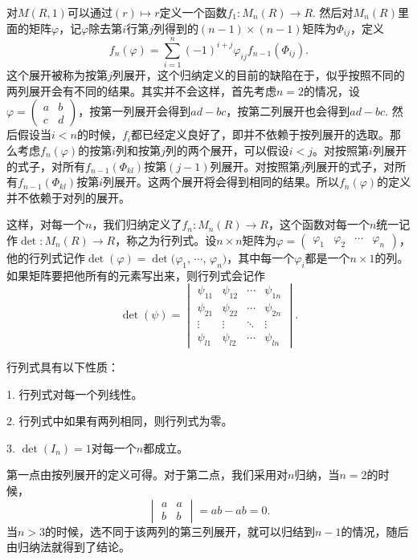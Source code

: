 对$M(R,1)$可以通过$(r)\mapsto r$定义一个函数$f_1:M_n(R)\to R$. 然后对$M_n(R)$里面的矩阵$\varphi$，记$\varphi$除去第$i$行第$j$列得到的$(n-1)\times (n-1)$矩阵为$\Phi_{ij}$，定义
\[
	f_n(\varphi)=\sum_{i=1}^n (-1)^{i+j}\varphi_{ij}f_{n-1}(\Phi_{ij}).
\]
这个展开被称为按第$j$列展开，这个归纳定义的目前的缺陷在于，似乎按照不同的两列展开会有不同的结果。其实并不会这样，首先考虑$n=2$的情况，设$\varphi=\begin{pmatrix}a&b\\c&d\end{pmatrix}$，按第一列展开会得到$ad-bc$，按第二列展开也会得到$ad-bc$. 然后假设当$i<n$的时候，$f_i$都已经定义良好了，即并不依赖于按列展开的选取。那么考虑$f_n(\varphi)$的按第$i$列和按第$j$列的两个展开，可以假设$i<j$。对按照第$i$列展开的式子，对所有$f_{n-1}(\Phi_{kl})$按第$(j-1)$列展开。对按照第$j$列展开的式子，对所有$f_{n-1}(\Phi_{kl})$按第$i$列展开。这两个展开将会得到相同的结果。所以$f_n(\varphi)$的定义并不依赖于对列的展开。

这样，对每一个$n$，我们归纳定义了$f_n:M_n(R)\to R$，这个函数对每一个$n$统一记作$\det:M_n(R)\to R$，称之为行列式。设$n\times n$矩阵为$\varphi=\begin{pmatrix}\varphi_{1} & \varphi_{2} & \cdots & \varphi_{n}\end{pmatrix}$，他的行列式记作$\det(\varphi)=\det(\varphi_1$, $\cdots$, $\varphi_n)$，其中每一个$\varphi_i$都是一个$n\times 1$的列。如果矩阵要把他所有的元素写出来，则行列式会记作
\[
\det(\psi)=\begin{vmatrix}
	\psi_{11} & \psi_{12} & \cdots & \psi_{1n}\\
	\psi_{21} & \psi_{22} & \cdots & \psi_{2n}\\
	\vdots & \vdots & \ddots & \vdots \\
	\psi_{l1} & \psi_{l2} & \cdots & \psi_{ln}
\end{vmatrix}.
\]

\pro 行列式具有以下性质：

1. 行列式对每一个列线性。

2. 行列式中如果有两列相同，则行列式为零。

3. $\det(I_n)=1$对每一个$n$都成立。

\proof 
	第一点由按列展开的定义可得。对于第二点，我们采用对$n$归纳，当$n=2$的时候，
	\[
		\begin{vmatrix}a&a\\b&b\end{vmatrix}=ab-ab=0.
	\]
	当$n>3$的时候，选不同于该两列的第三列展开，就可以归结到$n-1$的情况，随后由归纳法就得到了结论。

